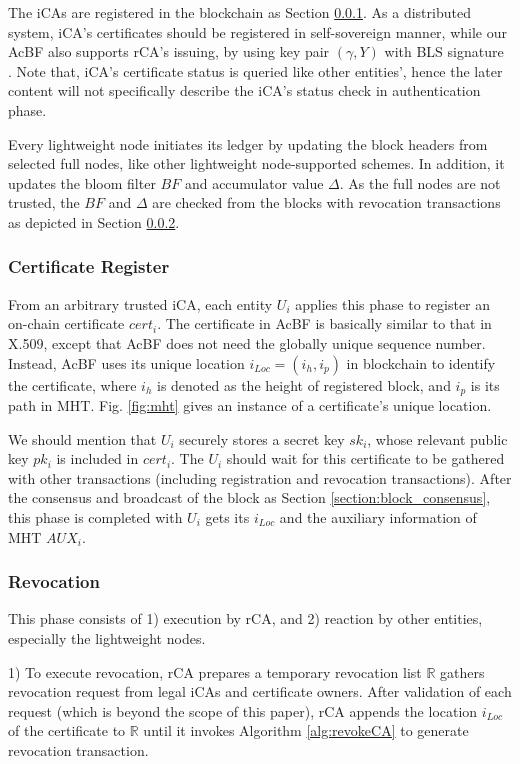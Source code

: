 \documentclass[conference]{IEEEtran}
\begin{document}
The iCAs are registered in the blockchain as Section \ref{section:register}. As a distributed system, iCA's certificates should be registered in self-sovereign manner, while our AcBF also supports rCA's issuing, by using key pair $(\gamma, Y)$ with BLS signature \cite{boneh2004short}. Note that, iCA's certificate status is queried like other entities', hence the later content will not specifically describe the iCA's status check in authentication phase. 


Every lightweight node initiates its ledger by updating the block headers from selected full nodes, like other lightweight node-supported schemes. In addition, it updates the bloom filter $BF$ and accumulator value $\Delta$. As the full nodes are not trusted, the $BF$ and $\Delta$ are checked from the blocks with revocation transactions as depicted in Section \ref{sec:revoke}.

\subsubsection{Certificate Register}\label{section:register}
From an arbitrary trusted iCA, each entity $U_i$ applies this phase to register an on-chain certificate $cert_i$. The certificate in AcBF is basically similar to that in X.509, except that AcBF does not need the globally unique sequence number. Instead, AcBF uses its unique location $i_{Loc} = (i_h, i_p)$ in blockchain to identify the certificate, where $i_h$ is denoted as the height of registered block, and $i_p$ is its path in MHT. Fig. \ref{fig:mht} gives an instance of a certificate's unique location.

We should mention that $U_i$ securely stores a secret key $sk_i$, whose relevant public key $pk_i$ is included in $cert_i$. The $U_i$ should wait for this certificate to be gathered with other transactions (including registration and revocation transactions). After the consensus and broadcast of the block as Section \ref{section:block_consensus}, this phase is completed with $U_i$ gets its $i_{Loc}$ and the auxiliary information of MHT $AUX_i$.


\subsubsection{Revocation} \label{sec:revoke}
This phase consists of 1) execution by rCA, and 2) reaction by other entities, especially the lightweight nodes. 

1) To execute revocation, rCA prepares a temporary revocation list $\mathbb{R}$ gathers revocation request from legal iCAs and certificate owners. After validation of each request (which is beyond the scope of this paper), rCA appends the location $i_{Loc}$ of the certificate to $\mathbb{R}$ until it invokes Algorithm \ref{alg:revokeCA} to generate revocation transaction. 
\end{document}
